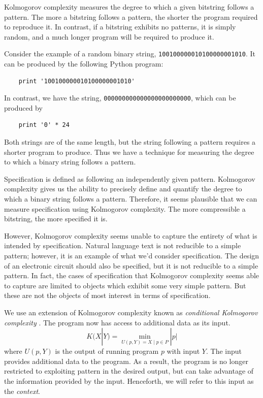 Kolmogorov complexity measures the degree to which a given bitstring follows a pattern.
The more a bitstring follows a pattern, the shorter the program required to reproduce it.
In contrast, if a bitstring exhibits no patterns, it is simply random, and a much longer program will be required to produce it.

Consider the example of a random binary string, {\tt 100100000010100000001010}.
It can be produced by the following Python program:
\begin{verbatim}
    print '100100000010100000001010'
\end{verbatim}
In contrast, we have the string, {\tt 000000000000000000000000}, which can be produced by
\begin{verbatim}
    print '0' * 24
\end{verbatim}
Both strings are of the same length, but the string following a pattern requires a shorter program to produce.
Thus we have a technique for measuring the degree to which a binary string follows a pattern.

Specification is defined as following an independently given pattern.
Kolmogorov complexity gives us the ability to precisely define and quantify the degree to which a binary string follows a pattern.
Therefore, it seems plausible that we can measure specification using Kolmogorov complexity.
The more compressible a bitstring, the more specified it is.

However, Kolmogorov complexity seems unable to capture the entirety of what is intended by specification.
Natural language text is not reducible to a simple pattern; however, it is an example of what we'd consider specification.
The design of an electronic circuit should also be specified, but it is not reducible to a simple pattern.
In fact, the cases of specification that Kolmogorov complexity seems able to capture are limited to objects which exhibit some very simple pattern.
But these are not the objects of most interest in terms of specification.

We use an extension of Kolmogorov complexity known as {\it conditional Kolmogorov complexity} \cite{Kolmogorov1968}.
The program now has access to additional data as its input.
\begin{equation}
    K(X|Y) = \min_{U(p,Y) = X \mid p \in P} |p|
\end{equation} where $U(p,Y)$ is the output of running program $p$ with input $Y$.
The input provides additional data to the program.
As a result, the program is no longer restricted to exploiting pattern in the desired output, but can take advantage of the information provided by the input.
Henceforth, we will refer to this input as the {\it context}.

